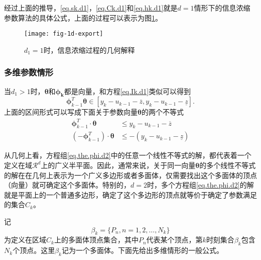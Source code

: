 经过上面的推导，\eqref{eq.sk.d1}，\eqref{eq.Ck.d1}和\eqref{eq.hk.d1}就是$d=1$情形下的信息浓缩参数算法的具体公式，上面的过程可以表示为图\ref{fig.1d.export}。
\begin{figure}
	\centering
	\texttt{[image: fig-1d-export]}\\	 %
	\caption{$d_{1}=1$时，信息浓缩过程的几何解释}
	\label{fig.1d.export}
\end{figure}

\subsubsection{多维参数情形}
\label{subsec2.3.3.2}
当$d_{1}>1$时，$\bm{\theta}$和$\bm{\phi_{k}}$都是向量，和方程\eqref{eq.Ik.d1}类似可以得到
\begin{equation}%
\label{eq.the.phi.d2}
\bm{\phi}_{k-1}^{T}\bm{\theta}\in[y_{k}-u_{k-1}-\overline{z},y_{k}-u_{k-1}-\underline{z}].
\end{equation}
上面的区间形式可以写成下面关于参数向量$\bm{\theta}$的两个不等式
\begin{equation}%
\label{eq.the.phi.d2}
\begin{split}%
\bm{\phi}_{k-1}^{T}\cdot\bm{\theta}&\leq y_{k}-u_{k-1}-\overline{z}\\
(-\bm{\phi}_{k-1}^{T})\cdot\bm{\theta}&\leq -(y_{k}-u_{k-1}-\underline{z})
\end{split}
\end{equation}

从几何上看，方程组\eqref{eq.the.phi.d2}中的任意一个线性不等式的解，都代表着一个定义在域$\mathcal{R}^{d}$上的广义半平面。因此，通常来说，关于同一向量$\bm{\theta}$的多个线性不等式的解在在几何上表示为一个广义多边形或者多面体，仅需要找出这个多面体的顶点（向量）就可确定这个多面体。特别的，$d=2$时，多个方程组\eqref{eq.the.phi.d2}的解就是平面上的一个普通多边形，确定了这个多边形的顶点就等价于确定了参数满足的集合$C_{k}$。

记
\begin{equation}%
\label{eq.Vk}
\beta_{k}=\{P_{n},n=1,2,\ldots,N_{k}\}
\end{equation}
为定义在区域$C_{k}$上的多面体顶点集合，其中$P_{n}$代表某个顶点，第$k$时刻集合$\beta_{k}$包含$N_{k}$个顶点。这里$\beta_{k}$记为一个多面体。下面先给出多维情形的一般公式。

